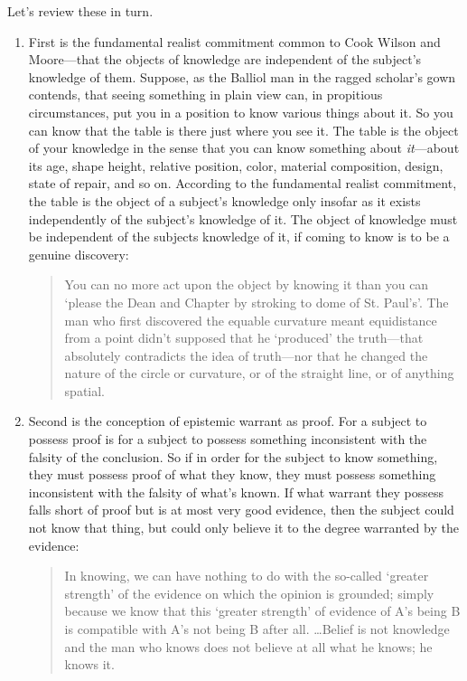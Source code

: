 \documentclass[12pt]{article}
\begin{document}
Let's review these in turn.

\begin{enumerate}[(1)]
	\item First is the fundamental realist commitment common to Cook Wilson and Moore\----that the objects of knowledge are independent of the subject's knowledge of them. Suppose, as the Balliol man in the ragged scholar's gown contends, that seeing something in plain view can, in propitious circumstances, put you in a position to know various things about it. So you can know that the table is there just where you see it. The table is the object of your knowledge in the sense that you can know something about \emph{it}---about its age, shape height, relative position, color, material composition, design, state of repair, and so on. According to the fundamental realist commitment, the table is the object of a subject's knowledge only insofar as it exists independently of the subject's knowledge of it. The object of knowledge must be independent of the subjects knowledge of it, if coming to know is to be a genuine discovery:
		\begin{quote}
			You can no more act upon the object by knowing it than you can `please the Dean and Chapter by stroking to dome of St. Paul's'. The man who first discovered the equable curvature meant equidistance from a point didn't supposed that he `produced' the truth---that absolutely contradicts the idea of truth---nor that he changed the nature of the circle or curvature, or of the straight line, or of anything spatial. \citep[802]{Cook-Wilson:1926sf}
		\end{quote}
	\item Second is the conception of epistemic warrant as proof. For a subject to possess proof is for a subject to possess something inconsistent with the falsity of the conclusion. So if in order for the subject to know something, they must possess proof of what they know, they must possess something inconsistent with the falsity of what's known. If what warrant they possess falls short of proof but is at most very good evidence, then the subject could not know that thing, but could only believe it to the degree warranted by the evidence: 
		\begin{quote}
			In knowing, we can have nothing to do with the so-called `greater strength' of the evidence on which the opinion is grounded; simply because we know that this `greater strength' of evidence of A's being B is compatible with A's not being B after all. \ldots Belief is not knowledge and the man who knows does not believe at all what he knows; he knows it. \citep[100]{Cook-Wilson:1926sf}

\end{quote}
\end{enumerate}
\end{document}
